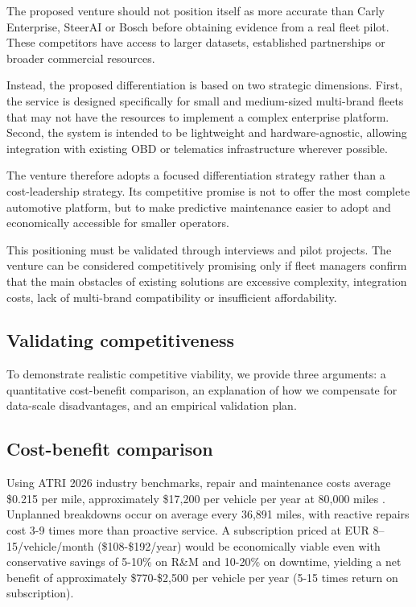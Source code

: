 \documentclass[11pt,a4paper]{article}
\begin{document}
\noindent The proposed venture should not position itself as more accurate than Carly
Enterprise, SteerAI or Bosch before obtaining evidence from a real fleet
pilot. These competitors have access to larger datasets, established
partnerships or broader commercial resources.\newline

\noindent Instead, the proposed differentiation is based on two strategic dimensions.
First, the service is designed specifically for small and medium-sized
multi-brand fleets that may not have the resources to implement a complex
enterprise platform. Second, the system is intended to be lightweight and
hardware-agnostic, allowing integration with existing OBD or telematics
infrastructure wherever possible.\newline

\noindent The venture therefore adopts a focused differentiation strategy rather than a
cost-leadership strategy. Its competitive promise is not to offer the most
complete automotive platform, but to make predictive maintenance easier to
adopt and economically accessible for smaller operators.\newline

\noindent This positioning must be validated through interviews and pilot projects. The
venture can be considered competitively promising only if fleet managers confirm
that the main obstacles of existing solutions are excessive complexity,
integration costs, lack of multi-brand compatibility or insufficient
affordability.\newline

\subsection{Validating competitiveness}
\noindent To demonstrate realistic competitive viability, we provide three arguments:
a quantitative cost-benefit comparison, an explanation of how we compensate for
data-scale disadvantages, and an empirical validation plan. 

\subsection*{Cost-benefit comparison}
\noindent Using ATRI 2026 industry benchmarks, repair and maintenance costs average 
\$0.215 per mile, approximately \$17,200 per vehicle per year at 80,000 miles . 
Unplanned breakdowns occur on average every 36,891 miles, with reactive repairs 
cost 3-9 times more than proactive service. A subscription priced at 
EUR 8--15/vehicle/month (\$108-\$192/year) would be economically viable even with 
conservative savings of 5-10\% on R\&M and 10-20\% on downtime, yielding a net 
benefit of approximately \$770-\$2,500 per vehicle per year 
(5-15 times return on subscription).
\end{document}
